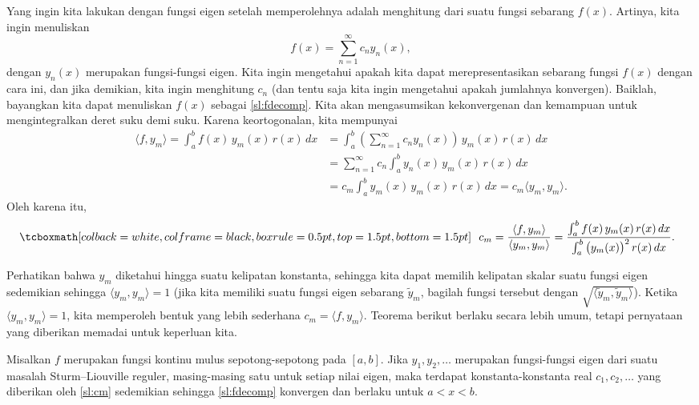 Yang ingin kita lakukan dengan fungsi eigen setelah memperolehnya adalah
menghitung \emph{} dari suatu fungsi sebarang
$f(x)$.  Artinya, kita ingin menuliskan
\begin{equation} \label{sl:fdecomp}
f(x) = \sum_{n=1}^\infty c_n y_n(x) ,
\end{equation}
dengan $y_n(x)$ merupakan fungsi-fungsi eigen.
Kita ingin mengetahui apakah kita dapat merepresentasikan
sebarang fungsi $f(x)$ dengan cara ini,
dan jika demikian, kita ingin menghitung $c_n$ (dan tentu saja kita ingin mengetahui apakah
jumlahnya konvergen).  Baiklah\@, bayangkan
kita dapat menuliskan $f(x)$ sebagai \eqref{sl:fdecomp}.  Kita akan mengasumsikan kekonvergenan dan
kemampuan untuk mengintegralkan deret suku demi suku.
Karena keortogonalan, kita mempunyai
\begin{equation*}
\begin{split}
\langle f , y_m \rangle
 = \int_a^b f(x) \, y_m (x) \, r(x) \, dx
& = \int_a^b \left( \sum_{n=1}^\infty c_n y_n(x) \right) \, y_m (x) \, r(x)
\, dx\\
&= \sum_{n=1}^\infty c_n \int_a^b y_n(x) \, y_m (x) \, r(x) \, dx\\
&= c_m \int_a^b y_m(x) \, y_m (x) \, r(x) \, dx = c_m \langle y_m , y_m \rangle
.
\end{split}
\end{equation*}
Oleh karena itu,
\begin{equation} \label{sl:cm}
\mybxbg{~~
c_m = \frac{\langle f , y_m \rangle}{\langle y_m , y_m \rangle}
=
\frac{\int_a^b f(x) \, y_m (x)\, r(x) \, dx}%
{\int_a^b {\bigl(y_m(x)\bigr)}^2 \, r(x) \,dx} .
~~}
\end{equation}

Perhatikan bahwa $y_m$ diketahui hingga suatu kelipatan konstanta, sehingga kita dapat memilih
kelipatan skalar suatu fungsi eigen sedemikian sehingga
$\langle y_m , y_m \rangle = 1$ (jika kita memiliki suatu fungsi eigen sebarang
$\tilde{y}_m$, bagilah fungsi tersebut
dengan $\sqrt{\langle \tilde{y}_m , \tilde{y}_m \rangle}$).
Ketika
$\langle y_m , y_m \rangle = 1$,
kita memperoleh bentuk yang
lebih sederhana $c_m = \langle f, y_m \rangle$.
Teorema berikut berlaku
secara lebih umum, tetapi pernyataan yang diberikan memadai untuk keperluan kita.

\begin{theorem}
Misalkan $f$ merupakan fungsi kontinu mulus sepotong-sepotong pada $[a,b]$.  Jika $y_1,
y_2, \ldots$ merupakan fungsi-fungsi eigen dari suatu masalah Sturm--Liouville reguler,
masing-masing satu untuk setiap nilai eigen,
maka terdapat konstanta-konstanta real $c_1, c_2, \ldots$ yang diberikan oleh \eqref{sl:cm}
sedemikian sehingga
\eqref{sl:fdecomp} konvergen dan berlaku untuk $a < x < b$.
\end{theorem}

